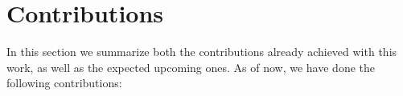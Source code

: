 
%

\section{Contributions}
\label{sec:contributions}

In this section we summarize both the contributions already achieved with this work, as well as the expected upcoming ones.
As of now, we have done the following contributions:

